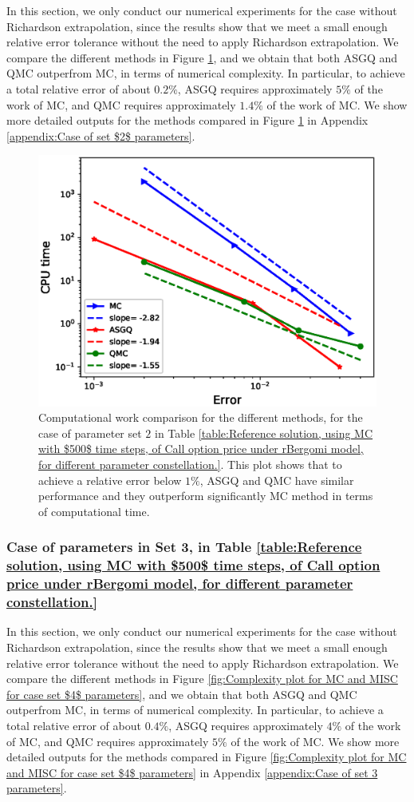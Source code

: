 In this section, we only conduct our numerical experiments for the case without Richardson extrapolation, since the results show that we meet a small enough relative error tolerance without the need to apply Richardson extrapolation. We compare the different methods  in Figure \ref{fig:Complexity plot for  MISC for case set $3$ parameters, comparison}, and we obtain that both ASGQ and QMC outperfrom MC, in terms of numerical complexity. In particular,  to achieve a total relative error of about $0.2\%$, ASGQ  requires
	approximately $5\%$ of the work of MC, and  QMC requires approximately $1.4\%$ of the work of MC. We show more detailed outputs for the methods compared in Figure \ref{fig:Complexity plot for  MISC for case set $3$ parameters, comparison} in Appendix \ref{appendix:Case of set $2$ parameters}. 
\FloatBarrier
	\begin{figure}[h!]
	\centering
	\includegraphics[width=0.5\linewidth]{./figures/rBergomi_Complexity_rates/set5/error_vs_time_set5_full_comparison}
	
	\caption{Computational work comparison for   the different  methods, for the case of parameter set $2$ in Table \ref{table:Reference solution, using MC with $500$ time steps, of Call option price under rBergomi model, for different parameter constellation.}. This plot shows that to achieve a relative error below $1\%$, ASGQ and QMC have similar performance and they outperform significantly  MC method in terms of computational time.}
	\label{fig:Complexity plot for  MISC for case set $3$ parameters, comparison}
\end{figure}
\FloatBarrier
\subsubsection{Case of parameters in Set 3, in Table \ref{table:Reference solution, using MC with $500$ time steps, of Call option price under rBergomi model, for different parameter constellation.} }\label{sec:Case of set 4 parameters}
In this section, we only conduct our numerical experiments for the case without Richardson extrapolation, since the results show that we meet a small enough relative error tolerance without the need to apply Richardson extrapolation. We compare the different methods  in Figure \ref{fig:Complexity plot for MC and MISC for case set $4$ parameters}, and we obtain that both ASGQ and QMC outperfrom MC, in terms of numerical complexity. In particular,  to achieve a total relative error of about $0.4\%$, ASGQ  requires
	approximately $4\%$ of the work of MC, and  QMC requires approximately $5\%$ of the work of MC. We show more detailed outputs for the methods compared in Figure \ref{fig:Complexity plot for MC and MISC for case set $4$ parameters} in Appendix \ref{appendix:Case of set 3 parameters}.


